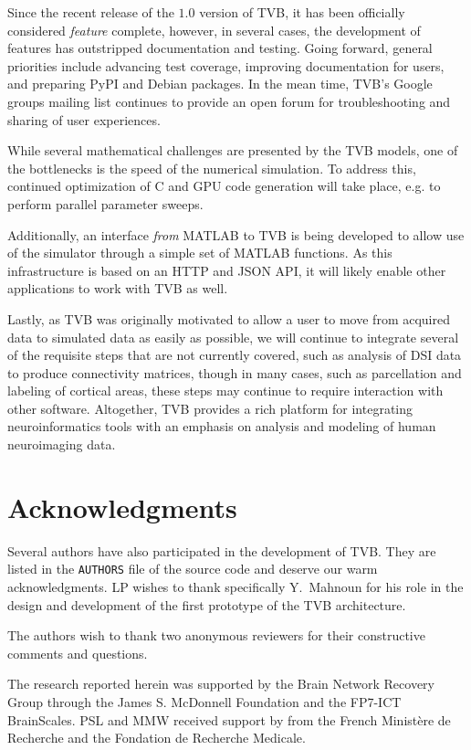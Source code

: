 \documentclass{bioinfo}
\begin{document}
Since the recent release of the $1.0$ version of TVB, it has been 
officially considered \textit{feature} complete, however, in several
cases, the development of features has outstripped documentation 
and testing. Going forward, general priorities include
advancing test coverage, improving documentation for users, and
preparing PyPI and Debian packages. In the mean
time, TVB's Google groups mailing list continues to
provide an open forum for troubleshooting and sharing of user experiences.

While several mathematical challenges are presented by the TVB models, 
one of the bottlenecks is the speed of the numerical simulation.
To address this, continued optimization of C and GPU code generation
will take place, e.g. to perform parallel parameter sweeps. 

Additionally, an interface \textit{from} MATLAB to TVB 
is being developed to allow use of the simulator through a simple
set of MATLAB functions. As this infrastructure is based on an HTTP and 
JSON API, it will likely enable other applications to work with TVB as well.

Lastly, as TVB was originally motivated to allow a user to move from acquired
data to simulated data as easily as possible, we will continue to integrate
several of the requisite steps that are not currently covered, such as analysis
of DSI data to produce connectivity matrices, though in many cases, such as
parcellation and labeling of cortical areas, these steps may continue to
require interaction with other software. Altogether, TVB provides a
rich platform for integrating neuroinformatics tools with an emphasis on
analysis and modeling of human neuroimaging data.


\section*{Acknowledgments}
Several authors have also participated in the
development of TVB. They are listed in the \texttt{AUTHORS} file 
of the source code and deserve our warm acknowledgments. LP wishes to thank
specifically Y.~Mahnoun for his role in the design and development
of the first prototype of the TVB architecture. 

The authors wish to thank two anonymous reviewers for their constructive comments
and questions.

The research reported herein
was supported by the  Brain Network Recovery Group through the James S.
McDonnell Foundation and the FP7-ICT BrainScales. PSL and MMW received
support by from the French Minist\`{e}re de Recherche and the Fondation
de Recherche Medicale.



\end{document}

